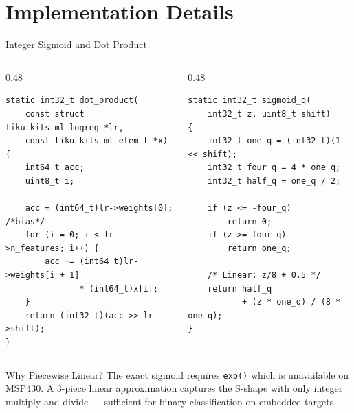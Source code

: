 \documentclass[aspectratio=169, 10pt]{beamer}
\begin{document}
\section{Implementation Details}

\begin{frame}[fragile]{Integer Sigmoid and Dot Product}
\begin{columns}[T]
\begin{column}{0.48\textwidth}
\begin{lstlisting}[style=cstyle,
  title={Dot product --- int64 accumulation}]
static int32_t dot_product(
    const struct tiku_kits_ml_logreg *lr,
    const tiku_kits_ml_elem_t *x)
{
    int64_t acc;
    uint8_t i;

    acc = (int64_t)lr->weights[0]; /*bias*/
    for (i = 0; i < lr->n_features; i++) {
        acc += (int64_t)lr->weights[i + 1]
               * (int64_t)x[i];
    }
    return (int32_t)(acc >> lr->shift);
}
\end{lstlisting}
\end{column}

\begin{column}{0.48\textwidth}
\begin{lstlisting}[style=cstyle,
  title={Piecewise sigmoid approximation}]
static int32_t sigmoid_q(
    int32_t z, uint8_t shift)
{
    int32_t one_q = (int32_t)(1 << shift);
    int32_t four_q = 4 * one_q;
    int32_t half_q = one_q / 2;

    if (z <= -four_q)
        return 0;
    if (z >= four_q)
        return one_q;

    /* Linear: z/8 + 0.5 */
    return half_q
           + (z * one_q) / (8 * one_q);
}
\end{lstlisting}
\end{column}
\end{columns}

\vspace{0.3em}
\begin{block}{Why Piecewise Linear?}
The exact sigmoid requires \texttt{exp()} which is unavailable on MSP430.
A 3-piece linear approximation captures the S-shape with only integer
multiply and divide --- sufficient for binary classification on embedded targets.
\end{block}
\end{frame}
\end{document}

